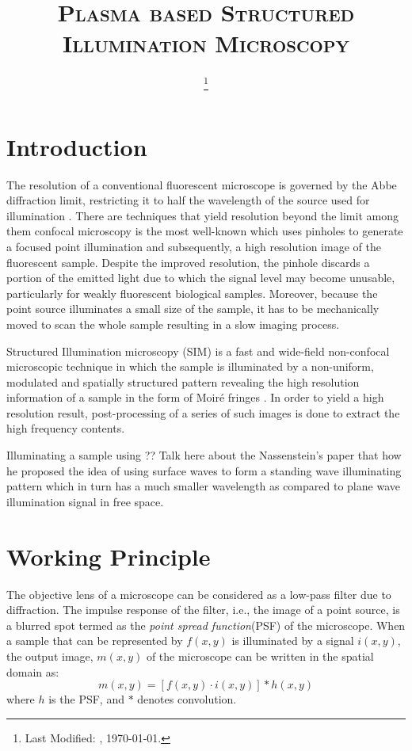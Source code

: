 \documentclass[11pt]{article}
\begin{document}
\title{\textsc{Plasma based Structured Illumination Microscopy}\\}
\date{\footnote{Last Modified: \currenttime, \today.}}
\maketitle

\section{Introduction}


The resolution of a conventional fluorescent microscope is governed by the Abbe diffraction limit, restricting it to half the wavelength of the source used for illumination \cite{0521639212}. There are techniques that yield resolution beyond the limit among them confocal microscopy is the most well-known which uses pinholes to generate a focused point illumination and subsequently, a high resolution image of the fluorescent sample. Despite the improved resolution, the pinhole discards a portion of the emitted light due to which the signal level may become unusable, particularly for weakly fluorescent biological samples. Moreover, because the point source illuminates a small size of the sample, it has to be mechanically moved to scan the whole sample resulting in a slow imaging process.

Structured Illumination microscopy (SIM) is a fast and wide-field non-confocal microscopic technique in which the sample is illuminated by a non-uniform, modulated and spatially structured pattern revealing the high resolution information of a sample in the form of Moiré fringes \cite{Gustafsson_2000,Heintzmann1999a}. In order to yield a high resolution result, post-processing of a series of such images is done to extract the high frequency contents.

Illuminating a sample using
?? Talk here about the Nassenstein's paper that how he proposed the idea of using surface waves to form a standing wave illuminating pattern which in turn has a much smaller wavelength as compared to plane wave illumination signal in free space.

\section{Working Principle}

The objective lens of a microscope can be considered as a low-pass filter due to diffraction. The impulse response of the filter, i.e., the image of a point source, is a blurred spot termed as the \emph{point spread function}(PSF) of the microscope. When a sample that can be represented by $f(x,y)$ is illuminated by a signal $i(x,y)$, the output image, $m(x,y)$ of the microscope can be written in the spatial domain as:
%
\begin{equation}
  m(x,y) = \left[ f(x,y) \cdot i(x,y) \right] \ast h(x,y)
  \label{eq:microscope}
\end{equation}
%
where $h$ is the PSF, and $\ast$ denotes convolution.
\end{document}
